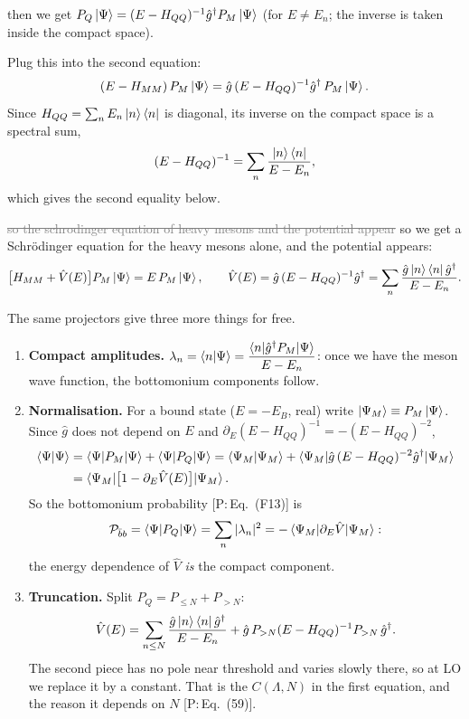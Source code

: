 \documentclass[11pt,a4paper]{article}
\newcommand{\tagP}[1]{\textcolor{blue!65!black}{\textsf{\small[P:\,#1]}}}
\newcommand{\Pbb}{{\cal P}_{\bar bb}}
\newcommand{\ai}[1]{\textcolor{aicolor}{#1}}
\newcommand{\aifix}[2]{\textcolor{gray}{\sout{#1}} \textcolor{aicolor}{#2}}
\newcommand{\ai}[1]{#1}
\newcommand{\aifix}[2]{#2}
\newenvironment{aiadd}{\par}{\par}
\begin{document}
then we get $P_Q\ket{\Psi} = (E-H_{QQ})^{-1}\hat{g}^\dagger P_M\ket{\Psi}$ \ai{(for $E\neq E_n$; the inverse is taken inside the compact space).}

\begin{aiadd}
	Plug this into the second equation:
	\[
		(E-H_{MM})\,P_M\ket\Psi=\hat g\,(E-H_{QQ})^{-1}\hat g^\dagger\,P_M\ket\Psi .
	\]
	Since $H_{QQ}=\sum_nE_n\ket n\bra n$ is diagonal, its inverse on the compact space is a spectral sum,
	\[
		(E-H_{QQ})^{-1}=\sum_n\frac{\ket n\bra n}{E-E_n},
	\]
	which gives the second equality below.
\end{aiadd}

\aifix{so the schrodinger equation of heavy mesons and the potential appear}{so we get a Schr\"odinger equation for the heavy mesons alone, and the potential appears:}
\begin{equation}
	\big[H_{MM}+\hat V(E)\big]P_M\ket\Psi=E\,P_M\ket\Psi,\qquad
	\hat V(E)=\hat g\,(E-H_{QQ})^{-1}\hat g^\dagger=\sum_n\frac{\hat g\ket n\bra n\hat g^\dagger}{E-E_n}.
	\label{draft:eq:Vop}
\end{equation}

\begin{aiadd}
	The same projectors give three more things for free.
	\begin{enumerate}
		\item \textbf{Compact amplitudes.} $\lambda_n=\braket{n|\Psi}=\dfrac{\braket{n|\hat g^\dagger P_M|\Psi}}{E-E_n}$: once we have the meson wave function, the bottomonium components follow.
		\item \textbf{Normalisation.} For a bound state ($E=-E_B$, real) write $\ket{\Psi_M}\equiv P_M\ket\Psi$. Since $\hat g$ does not depend on $E$ and $\partial_E(E-H_{QQ})^{-1}=-(E-H_{QQ})^{-2}$,
		      \begin{align*}
			      \braket{\Psi|\Psi} & =\braket{\Psi|P_M|\Psi}+\braket{\Psi|P_Q|\Psi}
			      =\braket{\Psi_M|\Psi_M}+\braket{\Psi_M|\hat g\,(E-H_{QQ})^{-2}\hat g^\dagger|\Psi_M} \\
			                         & =\braket{\Psi_M|\big[1-\partial_E\hat V(E)\big]|\Psi_M} .
		      \end{align*}
		      So the bottomonium probability \tagP{Eq.~(F13)} is
		      \[
			      \Pbb=\braket{\Psi|P_Q|\Psi}=\sum_n|\lambda_n|^2=-\braket{\Psi_M|\partial_E\hat V|\Psi_M}:
		      \]
		      the energy dependence of $\hat V$ \emph{is} the compact component.
		\item \textbf{Truncation.} Split $P_Q=P_{\le N}+P_{>N}$:
		      \[
			      \hat V(E)=\sum_{n\le N}\frac{\hat g\ket n\bra n\hat g^\dagger}{E-E_n}+\hat g\,P_{>N}(E-H_{QQ})^{-1}P_{>N}\,\hat g^\dagger .
		      \]
		      The second piece has no pole near threshold and varies slowly there, so at LO we replace it by a constant. That is the $C(\Lambda,N)$ in the first equation, and the reason it depends on $N$ \tagP{Eq.~(59)}.
	\end{enumerate}
\end{aiadd}
\end{document}
